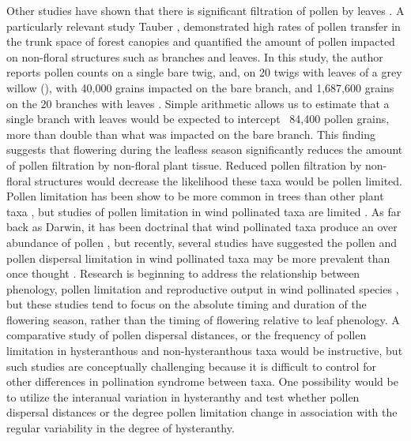 \documentclass{article}
\begin{document}
\indent Other studies have shown that there is significant filtration of pollen by leaves \citep*{Milleron2012, Tauber1967}. A particularly relevant study Tauber \citeyear{Tauber1967}, demonstrated high rates of pollen transfer in the trunk space of forest canopies and quantified the amount of pollen impacted on non-floral structures such as branches and leaves. In this study, the author reports pollen counts on a single bare twig, and, on 20 twigs with leaves of a grey willow (), with 40,000 grains impacted on the bare branch, and 1,687,600 grains on the 20 branches with leaves \citep{Tauber1967}. Simple arithmetic allows us to estimate that a single branch with leaves would be expected to intercept ~84,400 pollen grains, more than double than what was impacted on the bare branch. This finding suggests that flowering during the leafless season significantly reduces the amount of pollen filtration by non-floral plant tissue. Reduced pollen filtration by non-floral structures would decrease the likelihood these taxa would be pollen limited. Pollen limitation has been show to be more common in trees than other plant taxa \citep{Larson2000}, but studies of pollen limitation in wind pollinated taxa are limited \citep{Knight2005}. As far back as Darwin, it has been doctrinal that wind pollinated taxa produce an over abundance of pollen \citep{Friedman2009}, but recently, several studies have suggested the pollen and pollen dispersal limitation in wind pollinated taxa may be more prevalent than once thought \citep{Koenig2003}. Research is beginning to address the relationship between phenology, pollen limitation and reproductive output in wind pollinated species \citep*{Koenig2012, Koenig2015,Bogdziewicz2017}, but these studies tend to focus on the absolute timing and duration of the flowering season, rather than the timing of flowering relative to leaf phenology. A comparative study of pollen dispersal distances, or the frequency of pollen limitation in hysteranthous and non-hysteranthous taxa would be instructive, but such studies are conceptually challenging because it is difficult to control for other differences in pollination syndrome between taxa. One possibility would be to utilize the interanual variation in hysteranthy and test whether pollen dispersal distances or the degree pollen limitation change in association with the regular variability in the degree of hysteranthy. \\
\end{document}
